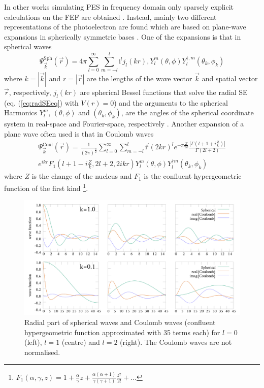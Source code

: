 In other works simulating PES in frequency domain only sparsely explicit calculations on the FEF are obtained \cite{ContOrb,H2pDeCleva}.
Instead, mainly two different representations of the photoelectron are found which are based on plane-wave expansions in spherically symmetric bases \cite{ezDyson,DO_TDDFT,do_modCoul}.
One of the expansions is that in spherical waves \cite{Lifschitz}
\begin{equation} \label{eq:spherWave}
\Psi^\text{Sph}_{\vec{k}}(\vec{r})=4\pi
\sum_{l=0}^\infty \sum_{m=-l}^l \text{i}^l j_l\left(kr\right), Y_l^m\left(\theta, \phi\right) Y^{\dagger,m}_l\left(\theta_k, \phi_k\right)
\end{equation}
where $k=|\vec{k}|$ and $r=|\vec{r}|$ are the lengths of the wave vector $\vec{k}$ and spatial vector $\vec{r}$, respectively, $j_l(kr)$ are spherical Bessel functions that solve the radial SE (eq. (\ref{eq:radSEeq}) with $V(r)=0$) and the arguments to the spherical Harmonics $Y_l^m$, $(\theta,\phi)$ and $(\theta_k,\phi_k)$, are the angles of the spherical coordinate system in real-space and Fourier-space, respectively \cite{ezDyson}.
Another expansion of a plane wave often used is that in Coulomb waves
\begin{multline} \label{eq:CoulWave}
\Psi^\text{Coul}_{\vec{k}}(\vec{r})=\frac{1}{(2\pi)^{\frac{3}{2}}}
\sum_{l=0}^\infty \sum_{m=-l}^l \text{i}^l (2kr)^l e^{-\pi\frac{Z}{2k}} \frac{|\Gamma(l+1+i\frac{Z}{k})|}{\Gamma(2l+2)} \\
e^{ikr} F_1(l+1-i\frac{Z}{k}, 2l+2, 2ikr) 
Y_l^m\left(\theta, \phi\right) Y^{\dagger m}_l\left(\theta_k, \phi_k\right)
\end{multline}
where $Z$ is the change of the nucleus and $F_1$ is the confluent hypergeometric function of the first kind \cite{do_modCoul,ColWave} \footnote{$F_1(\alpha,\gamma,z)=1+\frac{\alpha}{\gamma}z + \frac{\alpha (\alpha+1)}{\gamma (\gamma+1)} \frac{z^2}{2!}+\hdots $}.
\begin{figure}
\includegraphics[width=\textwidth]{Figures/RBF/RadialPart}
\caption{Radial part of spherical waves and Coulomb waves (confluent hypergeometric function approximated with 35 terms each) for $l=0$ (left), $l=1$ (centre) and $l=2$ (right).
The Coulomb waves are not normalised.}
\label{fig:RadFun}
\end{figure}

